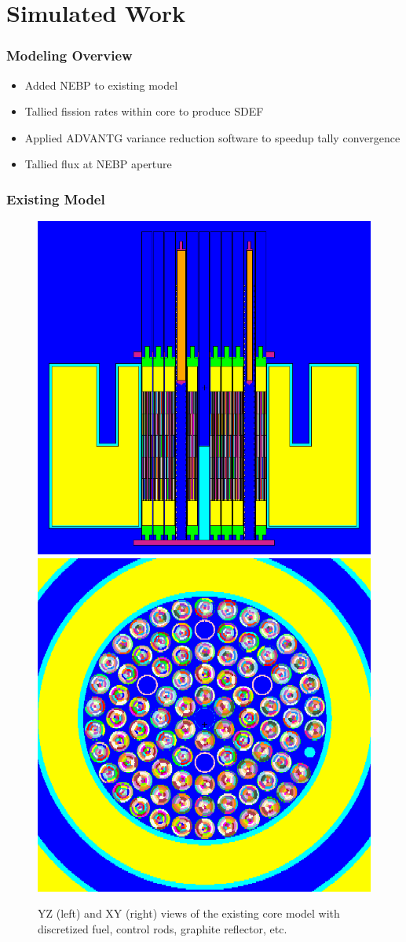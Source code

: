 \documentclass[fleqn]{beamer}
\begin{document}
\section{Simulated Work}
\begin{frame}
\frametitle{Modeling Overview}

\begin{itemize}
\item Added NEBP to existing model
\item Tallied fission rates within core to produce SDEF
\item Applied ADVANTG variance reduction software to speedup tally convergence
\item Tallied flux at NEBP aperture
\end{itemize}

\end{frame}

\begin{frame}
\frametitle{Existing Model}

\begin{figure}
\centering
\includegraphics[width = .5\textwidth]{existingyz}
\includegraphics[width = .5\textwidth]{existingxy}
\caption{YZ (left) and XY (right) views of the existing core model with discretized fuel, control rods, graphite reflector, etc.}
\end{figure}

\end{frame}
\end{document}
